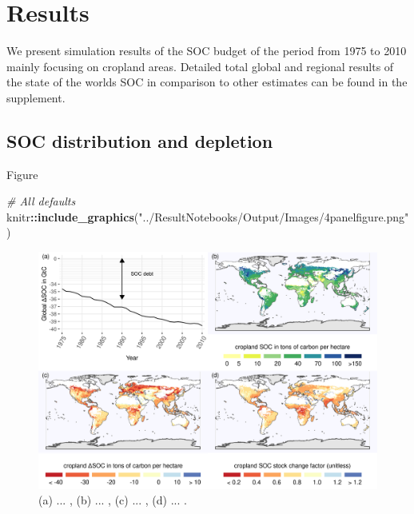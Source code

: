 \documentclass[gc, manuscript]{copernicus}
\newenvironment{Shaded}{\begin{snugshade}}{\end{snugshade}}
\newcommand{\CommentTok}[1]{\textcolor[rgb]{0.56,0.35,0.01}{\textit{#1}}}
\newcommand{\KeywordTok}[1]{\textcolor[rgb]{0.13,0.29,0.53}{\textbf{#1}}}
\newcommand{\NormalTok}[1]{#1}
\newcommand{\OperatorTok}[1]{\textcolor[rgb]{0.81,0.36,0.00}{\textbf{#1}}}
\newcommand{\StringTok}[1]{\textcolor[rgb]{0.31,0.60,0.02}{#1}}
\begin{document}
\newpage

\hypertarget{results}{%
\section{Results}\label{results}}

We present simulation results of the SOC budget of the period from 1975 to 2010 mainly focusing on cropland areas. Detailed total global and regional results of the state of the worlds SOC in comparison to other estimates can be found in the supplement.

\hypertarget{soc-distribution-and-depletion}{%
\subsection{SOC distribution and depletion}\label{soc-distribution-and-depletion}}

Figure

\begin{Shaded}
\begin{Highlighting}[]
\CommentTok{\# All defaults}
\NormalTok{knitr}\OperatorTok{::}\KeywordTok{include\_graphics}\NormalTok{(}\StringTok{"../ResultNotebooks/Output/Images/4panelfigure.png"}\NormalTok{)}
\end{Highlighting}
\end{Shaded}

\begin{figure}
\includegraphics[width=18cm]{../ResultNotebooks/Output/Images/4panelfigure} \caption{(a) ... , (b) ... , (c) ... , (d) ... .}\label{fig:SOCmaps}
\end{figure}
\end{document}
